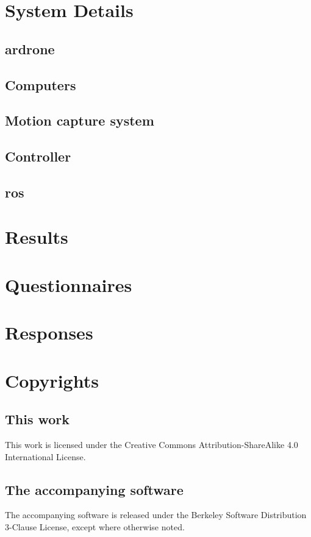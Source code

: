 \appendix
\chapter{System Details}
\section{\gls{ardrone}}
\section{Computers}  %
\section{Motion capture system}
\section{Controller}
\section{\gls{ros}}  %

\chapter{Results}

\chapter{Questionnaires}

\chapter{Responses}

\chapter{Copyrights}
\section{This work}
This work is licensed under the Creative Commons Attribution-ShareAlike 4.0 International License.
\section{The accompanying software}
The accompanying software is released under the Berkeley Software Distribution 3-Clause License, except where otherwise noted. 
